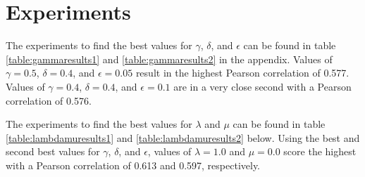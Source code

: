 \documentclass{article}
\begin{document}





\section{Experiments} \label{sec:experiments}

The experiments to find the best values for $\gamma$, $\delta$, and $\epsilon$ can be found in table \ref{table:gammaresults1} and \ref{table:gammaresults2} in the appendix. Values of $\gamma = 0.5$, $\delta = 0.4$, and $\epsilon = 0.05$ result in the highest Pearson correlation of 0.577. Values of $\gamma = 0.4$, $\delta = 0.4$, and $\epsilon = 0.1$ are in a very close second with a Pearson correlation of 0.576. 

The experiments to find the best values for $\lambda$ and $\mu$ can be found in table \ref{table:lambdamuresults1} and \ref{table:lambdamuresults2} below. Using the best and second best values for $\gamma$, $\delta$, and $\epsilon$, values of $\lambda = 1.0$ and $\mu = 0.0$ score the highest with a Pearson correlation of 0.613 and 0.597, respectively. 
\end{document}
